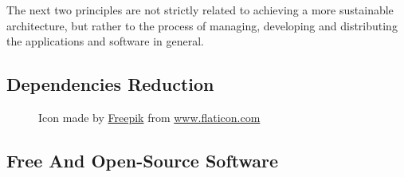 The next two principles are not strictly related to achieving a more sustainable
architecture, but rather to the process of managing, developing and distributing
the applications and software in general. \\ %

\subsection{Dependencies Reduction}
\label{subsec:introduction_principles_dependencies_reduction}

\begin{figure} %
  \centering
  \def\stackalignment{r} %
  {\scriptsize \parbox[t]{\linewidth}{ Icon made by \href{https://www.flaticon.com/authors/freepik}{Freepik} from \href{http://www.flaticon.com}{www.flaticon.com} }}
\end{figure}

\subsection{Free And Open-Source Software}
\label{subsec:introduction_principles_reusability_free_and_open_source_software}

